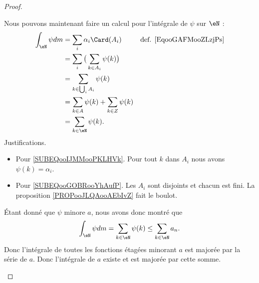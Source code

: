\begin{proof}
\begin{subproof}
        Nous pouvons maintenant faire un calcul pour l'intégrale de \( \psi\) sur \( \eN\) :
        \begin{subequations}        \label{SUBEQSooPMCHooIdtHqG}
            \begin{align}
                \int_{\eN}\psi dm&=\sum_i\alpha_i\Card(A_i)     &\text{def. \eqref{EqooGAFMooZLzjPs}}\\
                &=\sum_i\big( \sum_{k\in A_i}\psi(k)\big)       \label{SUBEQooIJMMooPKLHVk}\\
                &=\sum_{k\in \bigcup_iA_i}\psi(k)           \label{SUBEQooGOBRooYhAufP}\\
                &=\sum_{k\in A}\psi(k)+\sum_{k\in Z}\psi(k)\\
                &=\sum_{k\in \eN}\psi(k).
            \end{align}
        \end{subequations}
        Justifications.
        \begin{itemize}
            \item Pour \eqref{SUBEQooIJMMooPKLHVk}. Pour tout \( k\) dans \( A_i\) nous avons \( \psi(k)=\alpha_i\).
            \item Pour \eqref{SUBEQooGOBRooYhAufP}. Les \( A_i\) sont disjoints et chacun est fini. La proposition \ref{PROPooJLQAooAEbIvZ} fait le boulot.
        \end{itemize}
        Étant donné que \( \psi\) minore \( a\), nous avons donc montré que
        \begin{equation}
            \int_{\eN}\psi dm=\sum_{k\in \eN}\psi(k)\leq\sum_{k\in \eN}a_n.
        \end{equation}
        Donc l'intégrale de toutes les fonctions étagées minorant \( a\) est majorée par la série de \( a\). Donc l'intégrale de \( a\) existe et est majorée par cette somme.


\end{subproof}
\end{proof}
